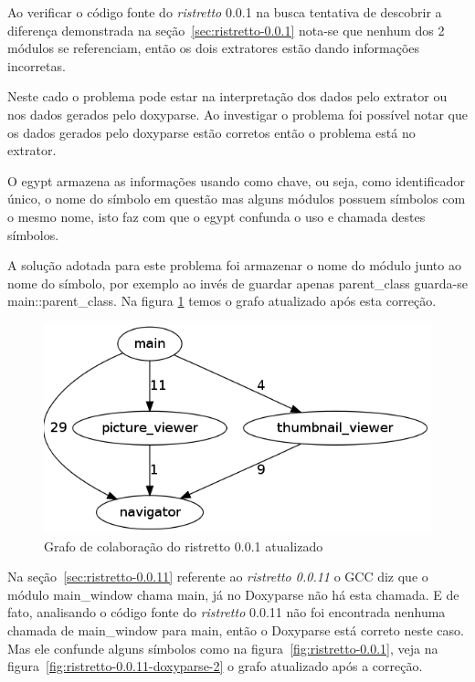Ao verificar o código fonte do {\it ristretto} 0.0.1 na busca tentativa de descobrir a diferença demonstrada na seção~\ref{sec:ristretto-0.0.1} 
nota-se que nenhum dos 2 módulos se referenciam, então os dois extratores estão dando informações incorretas.

Neste cado o problema pode estar na interpretação dos dados pelo extrator ou nos dados
gerados pelo doxyparse. Ao investigar o problema foi possível notar que os
dados gerados pelo doxyparse estão corretos então o problema está no extrator.

O egypt armazena as informações usando como chave, ou seja, como identificador
único, o nome do símbolo em questão mas alguns módulos possuem símbolos com o
mesmo nome, isto faz com que o egypt confunda o uso e chamada destes símbolos.

A solução adotada para este problema foi armazenar o nome do módulo junto ao
nome do símbolo, por exemplo ao invés de guardar apenas parent\_class guarda-se
main::parent\_class. Na figura \ref{fig:ristretto-0.0.1-doxyparse-2} temos o
grafo atualizado após esta correção.

\begin{figure}[h]
\center
\includegraphics[scale=0.3]{imagens/ristretto-0_0_1-doxyparse-2}
\caption{Grafo de colaboração do ristretto 0.0.1 atualizado}
\label{fig:ristretto-0.0.1-doxyparse-2}
\end{figure}

Na seção~\ref{sec:ristretto-0.0.11} referente ao {\it ristretto 0.0.11} o GCC diz que o módulo main\_window chama
main, já no Doxyparse não há esta chamada. E de fato, analisando o código fonte
do {\it ristretto} 0.0.11 não foi encontrada nenhuma chamada de main\_window para
main, então o Doxyparse está correto neste caso. Mas ele confunde alguns
símbolos como na figura~\ref{fig:ristretto-0.0.1}, veja na
figura~\ref{fig:ristretto-0.0.11-doxyparse-2} o grafo atualizado após a correção.

